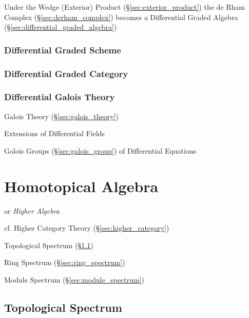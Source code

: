 Under the Wedge (Exterior) Product (\S\ref{sec:exterior_product}) the de Rham
Complex (\S\ref{sec:derham_complex}) becomes a Differential Graded Algebra
(\S\ref{sec:differential_graded_algebra})



\subsubsection{Differential Graded Scheme}\label{sec:differential_graded_scheme}

\subsubsection{Differential Graded Category}
\label{sec:differential_graded_category}

\subsubsection{Differential Galois Theory}\label{sec:differential_galois}

Galois Theory (\S\ref{sec:galois_theory})

Extensions of Differential Fields

Galois Groups (\S\ref{sec:galois_group}) of Differential Equations



\section{Homotopical Algebra}\label{sec:homotopical_algebra}

or \emph{Higher Algebra}

cf. Higher Category Theory (\S\ref{sec:higher_category})

Topological Spectrum (\S\ref{sec:topological_spectrum})

Ring Spectrum (\S\ref{sec:ring_spectrum})

Module Spectrum (\S\ref{sec:module_spectrum})



\subsection{Topological Spectrum}\label{sec:topological_spectrum}

